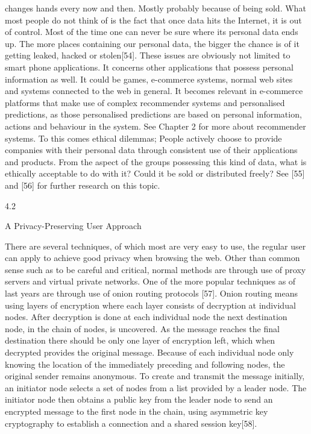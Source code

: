 changes hands every now and then. Mostly probably because of being sold. What most
people do not think of is the fact that once data hits the Internet, it is out of control.
Most of the time one can never be sure where its personal data ends up. The more
places containing our personal data, the bigger the chance is of it getting leaked, hacked
or stolen[54].
These issues are obviously not limited to smart phone applications. It concerns other
applications that possess personal information as well. It could be games, e-commerce
systems, normal web sites and systems connected to the web in general. It becomes
relevant in e-commerce platforms that make use of complex recommender systems and
personalised predictions, as those personalised predictions are based on personal information, actions and behaviour in the system. See Chapter 2 for more about recommender
systems.
To this comes ethical dilemmas; People actively choose to provide companies with their
personal data through consistent use of their applications and products. From the aspect
of the groups possessing this kind of data, what is ethically acceptable to do with it?
Could it be sold or distributed freely? See [55] and [56] for further research on this topic.

4.2

A Privacy-Preserving User Approach

There are several techniques, of which most are very easy to use, the regular user can
apply to achieve good privacy when browsing the web. Other than common sense such
as to be careful and critical, normal methods are through use of proxy servers and virtual
private networks. One of the more popular techniques as of last years are through use
of onion routing protocols [57].
Onion routing means using layers of encryption where each layer consists of decryption at individual nodes. After decryption is done at each individual node the next
destination node, in the chain of nodes, is uncovered. As the message reaches the final
destination there should be only one layer of encryption left, which when decrypted provides the original message. Because of each individual node only knowing the location of
the immediately preceding and following nodes, the original sender remains anonymous.
To create and transmit the message initially, an initiator node selects a set of nodes
from a list provided by a leader node. The initiator node then obtains a public key
from the leader node to send an encrypted message to the first node in the chain, using
asymmetric key cryptography to establish a connection and a shared session key[58].

